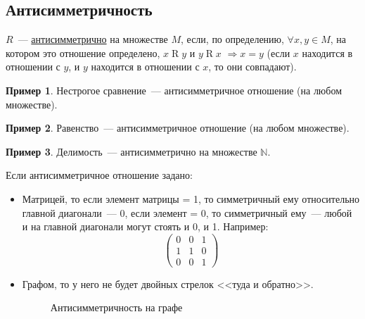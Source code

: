 \documentclass[russian]{lecture-notes}
\theoremstyle{definition}
\newtheorem{example*}{Пример}[subsection]
\newcommand{\relation}[2]{$#1\mathrel{R}#2$}
\begin{document}
\subsection{Антисимметричность \label{opr:antisimmetr}}
\begin{definition}
	$R$~--- \underline{антисимметрично} на множестве $M$, если, по определению, $\forall x, y \in M$, на котором это отношение определено, \relation{x}{y} и \relation{y}{x} $\Rightarrow x=y$ (если $x$ находится в отношении с $y$, и $y$ находится в отношении с $x$, то они совпадают).
\end{definition}

\begin{example*}
	Нестрогое сравнение~--- антисимметричное отношение (на любом множестве).
\end{example*}

\begin{example*}
	Равенство~--- антисимметричное отношение (на любом множестве).
\end{example*}

\begin{example*}
	Делимость~--- антисимметрично на множестве $\mathbb{N}$.
\end{example*}

Если антисимметричное отношение задано:
\begin{itemize}
	\item Матрицей, то если элемент матрицы = 1, то симметричный ему относительно главной диагонали~--- 0, если элемент = 0, то симметричный ему~--- любой и на главной диагонали могут стоять и 0, и 1. Например:
	\begin{equation*}
	\left(
	\begin{array}{cccc}
	0 & 0 & 1\\
	1 & 1 & 0\\
	0 & 0 & 1
	\end{array}
	\right) 
	\end{equation*}
	
	\item Графом, то у него не будет двойных стрелок <<туда и обратно>>.
	\begin{figure}[H]
		\centering
		\caption{\small Антисимметричность на графе}
		\label{fig:antisimmetr}
	\end{figure}
\end{itemize}
\end{document}
